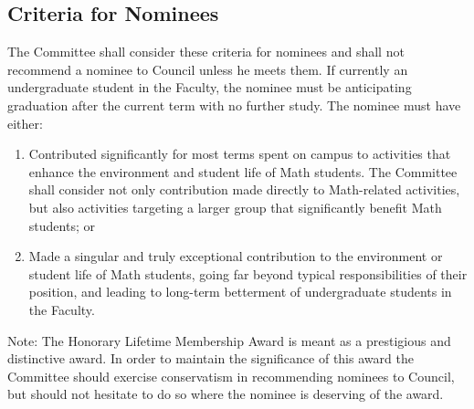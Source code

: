 \subsection{Criteria for Nominees}
The Committee shall consider these criteria for nominees and shall not recommend a nominee to Council unless he meets them.
If currently an undergraduate student in the Faculty, the nominee must be anticipating graduation after the current term with no further study.
The nominee must have either:
\begin{enumerate}
\item Contributed significantly for most terms spent on campus to activities that enhance the environment and student life of Math students. The Committee shall consider not only contribution made directly to Math-related activities, but also activities targeting a larger group that significantly benefit Math students; or
\item Made a singular and truly exceptional contribution to the environment or student life of Math students, going far beyond typical responsibilities of their position, and leading to long-term betterment of undergraduate students in the Faculty.
\end{enumerate}

Note: The Honorary Lifetime Membership Award is meant as a prestigious and distinctive award. In order to maintain the significance of this award the Committee should exercise conservatism in recommending nominees to Council, but should not hesitate to do so where the nominee is deserving of the award.
